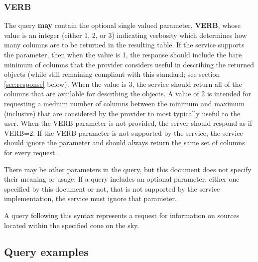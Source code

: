 \documentclass[11pt,a4paper]{ivoa}
\newcommand\ada[1]{\textcolor{blue}{\textbf{#1}}}
\begin{document}
\subsubsection{VERB}
The query \textbf{may} contain the optional single valued parameter, \textbf{VERB}, whose value is an integer (either 1, 2, or 3) indicating verbosity which determines how many columns are to be returned in the resulting table. If the service supports the parameter, then when the value is 1, the response should include the bare minimum of columns that the provider considers useful in describing the returned objects (while still remaining compliant with this standard; see section \ref{sec:response} below). When the value is 3, the service should return all of the columns that are available for describing the objects. A value of 2 is intended for requesting a medium number of columns between the minimum and maximum (inclusive) that are considered by the provider to most typically useful to the user. When the VERB parameter is not provided, the server should respond as if VERB=2. If the VERB parameter is not supported by the service, the service should ignore the parameter and should always return the same set of columns for every request.

There may be other parameters in the query, but this document does not specify their meaning or usage. If a query includes an optional parameter, either one specified by this document or not, that is not supported by the service implementation, the service must ignore that parameter.

A query following this syntax represents a request for information on sources located within the specified cone on the sky.

\subsection{Query examples}
\end{document}
